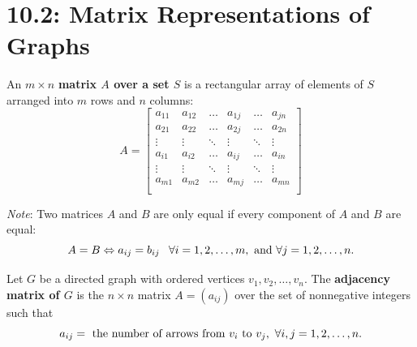 \documentclass[../mathNotesPreamble]{subfiles}
\providecommand{\relscalefact}{1.4}
\begin{document}
\relscale{\relscalefact}
  \section{10.2: Matrix Representations of Graphs}
  \begin{defn*}
    An $m\times n$ \textbf{matrix $A$ over a set $S$} is a rectangular array of elements of $S$ arranged into $m$ rows and $n$ columns:
      \[A=\begin{bmatrix}
        a_{11}& a_{12}& \dots& a_{1j}& \dots& a_{jn}\\
        a_{21}& a_{22}& \dots& a_{2j}& \dots& a_{2n}\\
        \vdots& \vdots& \ddots& \vdots& \ddots& \vdots\\
        a_{i1}& a_{i2}& \dots& a_{ij}& \dots& a_{in}\\
        \vdots& \vdots& \ddots& \vdots& \ddots& \vdots\\
        a_{m1}& a_{m2}& \dots& a_{mj}& \dots& a_{mn}\\
      \end{bmatrix}\]
  \end{defn*}
    \emph{Note}: Two matrices $A$ and $B$ are only equal if every component of $A$ and $B$ are equal:
      \[A=B \Leftrightarrow a_{ij}=b_{ij}\hspace*{8pt} \forall i=1,2,\dots,m, \textnormal{ and } \forall j=1,2,\dots,n.\]

  \begin{defn*}
    Let $G$ be a directed graph with ordered vertices $v_1, v_2,\dots, v_n$. The \textbf{adjacency matrix of $G$} is the $n\times n$ matrix $A=(a_{ij})$ over the set of nonnegative integers such that
      \[a_{ij}=\textnormal{ the number of arrows from } v_i \textnormal{ to } v_j,\ \forall i,j=1,2,\dots,n.\]
  \end{defn*}
\end{document}

